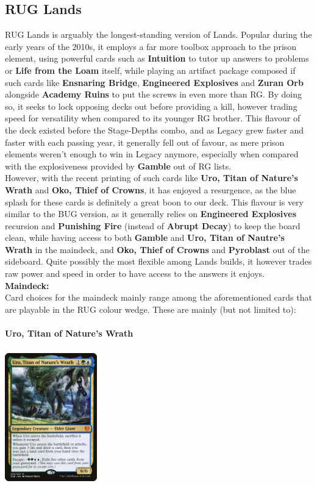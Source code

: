 \documentclass{report}
\begin{document}
\subsection{RUG Lands}
RUG Lands is arguably the longest-standing version of Lands. Popular during the early years of the 2010s, it employs a far more toolbox approach to the prison element, using powerful cards such as \textbf{Intuition} to tutor  up answers to problems or \textbf{Life from the Loam} itself, while playing an artifact package composed if such cards like \textbf{Ensnaring Bridge}, \textbf{Engineered Explosives} and \textbf{Zuran Orb} alongside \textbf{Academy Ruins} to put the screws in even more than RG. By doing so, it seeks to lock opposing decks out before providing a kill, however trading speed for versatility when compared to its younger RG brother. This flavour of the deck existed before the Stage-Depths combo, and as Legacy grew faster and faster with each passing year, it generally fell out of favour, as mere prison elements weren't enough to win in Legacy anymore, especially when compared with the explosiveness provided by \textbf{Gamble} out of RG lists.\\
However, with the recent printing of such cards like \textbf{Uro, Titan of Nature's Wrath} and \textbf{Oko, Thief of Crowns}, it has enjoyed a resurgence, as the blue splash for these cards is definitely a great boon to our deck. This flavour is very similar to the BUG version, as it generally relies on \textbf{Engineered Explosives} recursion and \textbf{Punishing Fire} (instead of \textbf{Abrupt Decay}) to keep the board clean, while having access to both \textbf{Gamble} and \textbf{Uro, Titan of Nautre's Wrath} in the maindeck, and \textbf{Oko, Thief of Crowns} and \textbf{Pyroblast} out of the sideboard. Quite possibly the most flexible among Lands builds, it however trades raw power and speed in order to have access to the answers it enjoys.\\
\textbf{Maindeck:\\}
Card choices for the maindeck mainly range among the aforementioned cards that are playable in the RUG colour wedge. These are mainly (but not limited to):\\\\
\newpage
\textbf{Uro, Titan of Nature's Wrath\\}
\begin{center}
\includegraphics [width = 4cm, height = 6cm] {uro}
\end{center}
\end{document}
